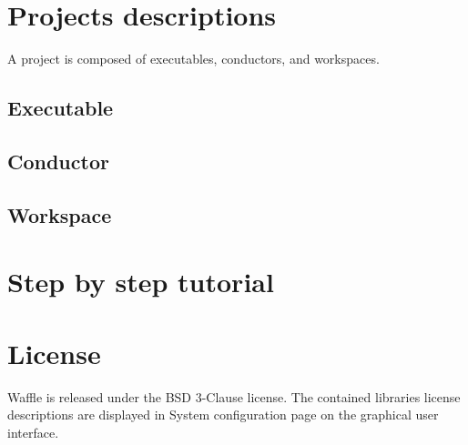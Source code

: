 \documentclass[a4paper]{article}
\begin{document}
\section{Projects descriptions}
A project is composed of executables, conductors, and workspaces.

\subsection{Executable}
\subsection{Conductor}
\subsection{Workspace}

\section{Step by step tutorial}

\section{License}
Waffle is released under the BSD 3-Clause license.
The contained libraries license descriptions are displayed in System configuration page on the graphical user interface.
\end{document}
